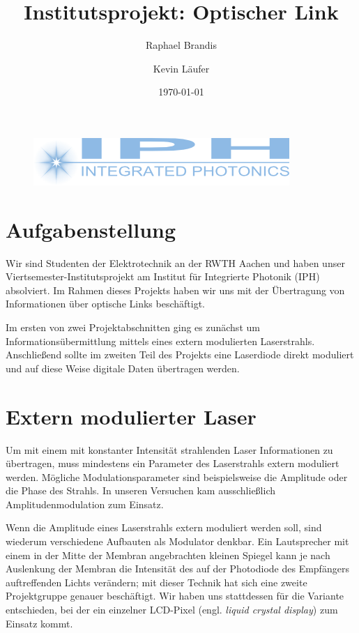 \documentclass[12pt,a4paper]{article}
\title{Institutsprojekt: Optischer Link}
\author{Raphael Brandis \and Kevin Läufer}
\date{\today}
\begin{document}
\maketitle
\vfill

\begin{figure}[h]
  \centering
    \includegraphics{../iph_logo.png}
\end{figure}

\newpage
\tableofcontents
\newpage

\section{Aufgabenstellung}
Wir sind Studenten der Elektrotechnik an der RWTH Aachen und haben unser Viertsemester-Institutsprojekt am Institut für Integrierte Photonik (IPH) absolviert. Im Rahmen dieses Projekts haben wir uns mit der Übertragung von Informationen über optische Links beschäftigt.

Im ersten von zwei Projektabschnitten ging es zunächst um Informationsübermittlung mittels eines extern modulierten Laserstrahls. Anschließend sollte im zweiten Teil des Projekts eine Laserdiode direkt moduliert und auf diese Weise digitale Daten übertragen werden.


\section{Extern modulierter Laser}
Um mit einem mit konstanter Intensität strahlenden Laser Informationen zu übertragen, muss mindestens ein Parameter des Laserstrahls extern moduliert werden. Mögliche Modulationsparameter sind beispielsweise die Amplitude oder die Phase des Strahls. In unseren Versuchen kam ausschließlich Amplitudenmodulation zum Einsatz.

Wenn die Amplitude eines Laserstrahls extern moduliert werden soll, sind wiederum verschiedene Aufbauten als Modulator denkbar. Ein Lautsprecher mit einem in der Mitte der Membran angebrachten kleinen Spiegel kann je nach Auslenkung der Membran die Intensität des auf der Photodiode des Empfängers auftreffenden Lichts verändern; mit dieser Technik hat sich eine zweite Projektgruppe genauer beschäftigt. Wir haben uns stattdessen für die Variante entschieden, bei der ein einzelner LCD-Pixel (engl. \textit{liquid crystal display}) zum Einsatz kommt.
\end{document}
